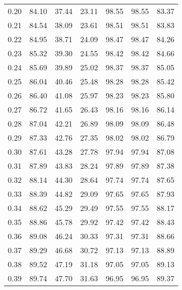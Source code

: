\begin{tabular}{|c|c|c|c|c|c|c|}
      0.20 &     84.10 &     37.44 &      23.11 &   98.55 &      98.55 &         83.37 \\
      0.21 &     84.54 &     38.09 &      23.61 &   98.51 &      98.51 &         83.83 \\
      0.22 &     84.95 &     38.71 &      24.09 &   98.47 &      98.47 &         84.26 \\
      0.23 &     85.32 &     39.30 &      24.55 &   98.42 &      98.42 &         84.66 \\
      0.24 &     85.69 &     39.89 &      25.02 &   98.37 &      98.37 &         85.05 \\
      0.25 &     86.04 &     40.46 &      25.48 &   98.28 &      98.28 &         85.42 \\
      0.26 &     86.40 &     41.08 &      25.97 &   98.23 &      98.23 &         85.80 \\
      0.27 &     86.72 &     41.65 &      26.43 &   98.16 &      98.16 &         86.14 \\
      0.28 &     87.04 &     42.21 &      26.89 &   98.09 &      98.09 &         86.48 \\
      0.29 &     87.33 &     42.76 &      27.35 &   98.02 &      98.02 &         86.79 \\
      0.30 &     87.61 &     43.28 &      27.78 &   97.94 &      97.94 &         87.08 \\
      0.31 &     87.89 &     43.83 &      28.24 &   97.89 &      97.89 &         87.38 \\
      0.32 &     88.14 &     44.30 &      28.64 &   97.74 &      97.74 &         87.65 \\
      0.33 &     88.39 &     44.82 &      29.09 &   97.65 &      97.65 &         87.93 \\
      0.34 &     88.62 &     45.29 &      29.49 &   97.55 &      97.55 &         88.17 \\
      0.35 &     88.86 &     45.78 &      29.92 &   97.42 &      97.42 &         88.43 \\
      0.36 &     89.08 &     46.24 &      30.33 &   97.31 &      97.31 &         88.66 \\
      0.37 &     89.29 &     46.68 &      30.72 &   97.13 &      97.13 &         88.89 \\
      0.38 &     89.52 &     47.19 &      31.18 &   97.05 &      97.05 &         89.13 \\
      0.39 &     89.74 &     47.70 &      31.63 &   96.95 &      96.95 &         89.37 \\

\end{tabular}
